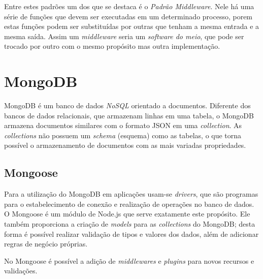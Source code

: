 Entre estes padrões um dos que se destaca é o \textit{Padrão Middleware}. Nele há uma série de funções que devem ser executadas em um determinado processo, porem estas funções podem ser substituídas por outras que tenham a mesma entrada e a mesma saída. Assim um \textit{middleware} seria um \textit{software do meio}, que pode ser trocado por outro com o mesmo propósito mas outra implementação.


\section{MongoDB}

MongoDB \cite{MONGODB} é um banco de dados \textit{NoSQL} \cite{NOSQLORG} orientado a documentos. Diferente dos bancos de dados relacionais, que armazenam linhas em uma tabela, o MongoDB armazena documentos similares com o formato JSON em uma \textit{collection}. As \textit{collections} não possuem um \textit{schema} (esquema) como as tabelas, o que torna possível o armazenamento de documentos com as mais variadas propriedades.


\subsection{Mongoose}

Para a utilização do MongoDB em aplicações usam-se \textit{drivers}, que são programas para o estabelecimento de conexão e realização de operações no banco de dados. O Mongoose é um módulo de Node.js que serve exatamente este propósito. Ele também proporciona a criação de \textit{models} para as \textit{collections} do MongoDB; desta forma é possível realizar validação de tipos e valores dos dados, além de adicionar regras de negócio próprias.

No Mongoose é possível a adição de \textit{middlewares} e \textit{plugins} para novos recursos e validações.